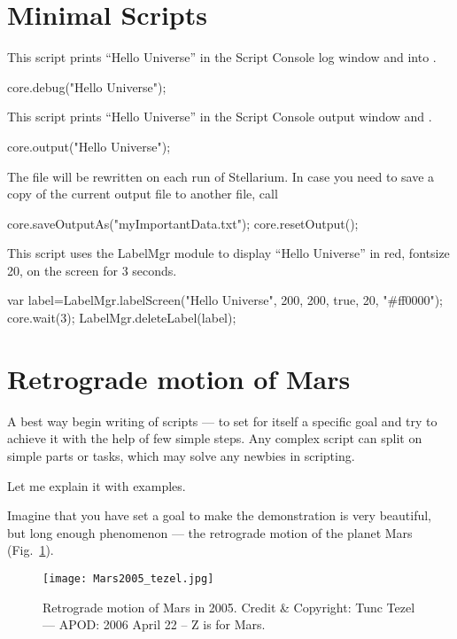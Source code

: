 \section{Minimal Scripts}
\label{sec:scripting:MinimalScript}
This script prints ``Hello Universe'' in the Script Console log window and into . 
\begin{script}
core.debug("Hello Universe");
\end{script}

\noindent This script prints ``Hello Universe'' in the Script Console output window and . 
\begin{script}
core.output("Hello Universe");
\end{script}
The file  will be rewritten on each run of Stellarium. In case you need to save a copy of the current output file to another file, call 
\begin{script}
core.saveOutputAs("myImportantData.txt");
core.resetOutput();
\end{script}

\noindent This script uses the LabelMgr module to display ``Hello Universe'' in red, fontsize 20, on the screen for 3 seconds.
\begin{script}
var label=LabelMgr.labelScreen("Hello Universe", 200, 200, 
                               true, 20, "#ff0000");
core.wait(3);
LabelMgr.deleteLabel(label);
\end{script}

\section{Retrograde motion of Mars}
\label{sec:scripting:RetrogradeMotionOfMars}
A best way begin writing of scripts --- to set for itself a specific goal and try to achieve it with the help of few simple steps. Any complex script can split on simple parts or tasks, which may solve any newbies in scripting. 

Let me explain it with examples.

Imagine that you have set a goal to make the demonstration is very beautiful, but long enough phenomenon --- the retrograde motion of the planet Mars (Fig.~\ref{fig:scripting:mars2005}). 

\begin{figure}[ht]
\centering\texttt{[image: Mars2005\_tezel.jpg]}
\label{fig:scripting:mars2005}
\caption{Retrograde motion of Mars in 2005. Credit \& Copyright: Tunc Tezel --- APOD: 2006 April 22 -- Z is for Mars.}
\end{figure}

